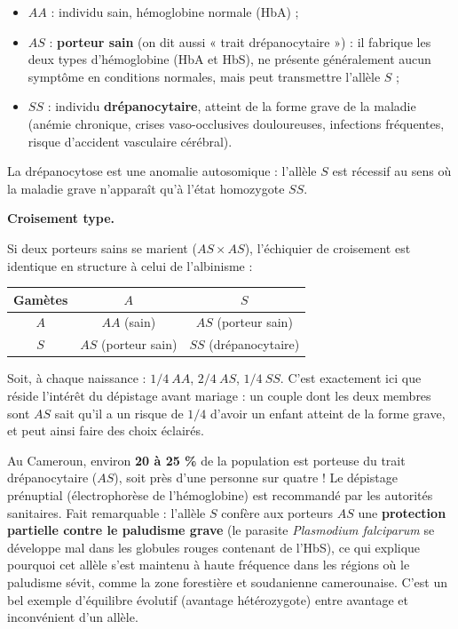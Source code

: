 \documentclass[11pt]{article}
\newcommand{\cle}[1]{{\popxbold\color{popdark}#1}}
\begin{document}
\begin{definition}
\begin{itemize}
\item $AA$ : individu sain, hémoglobine normale (HbA) ;
\item $AS$ : \textbf{porteur sain} (on dit aussi « trait drépanocytaire ») : il fabrique les deux types d'hémoglobine (HbA et HbS), ne présente généralement aucun symptôme en conditions normales, mais peut transmettre l'allèle $S$ ;
\item $SS$ : individu \textbf{drépanocytaire}, atteint de la forme grave de la maladie (anémie chronique, crises vaso-occlusives douloureuses, infections fréquentes, risque d'accident vasculaire cérébral).
\end{itemize}
La drépanocytose est une anomalie autosomique : l'allèle $S$ est récessif au sens où la maladie grave n'apparaît qu'à l'état homozygote $SS$.
\end{definition}

\textbf{Croisement type.}\par
Si deux porteurs sains se marient ($AS \times AS$), l'échiquier de croisement est identique en structure à celui de l'albinisme :

\begin{center}
\begin{tabular}{|c|c|c|}
\hline
\rowcolor{popblueL} \textbf{Gamètes} & $A$ & $S$ \\
\hline
$A$ & $AA$ (sain) & $AS$ (porteur sain) \\
\hline
$S$ & $AS$ (porteur sain) & $SS$ (drépanocytaire) \\
\hline
\end{tabular}
\end{center}

Soit, à chaque naissance : $1/4\ AA$, $2/4\ AS$, $1/4\ SS$. C'est exactement ici que réside l'intérêt du \cle{dépistage avant mariage} : un couple dont les deux membres sont $AS$ sait qu'il a un risque de $1/4$ d'avoir un enfant atteint de la forme grave, et peut ainsi faire des choix éclairés.

\begin{savaistu}
Au Cameroun, environ \textbf{20 à 25 \%} de la population est porteuse du trait drépanocytaire ($AS$), soit près d'une personne sur quatre ! Le dépistage prénuptial (électrophorèse de l'hémoglobine) est recommandé par les autorités sanitaires. Fait remarquable : l'allèle $S$ confère aux porteurs $AS$ une \textbf{protection partielle contre le paludisme grave} (le parasite \emph{Plasmodium falciparum} se développe mal dans les globules rouges contenant de l'HbS), ce qui explique pourquoi cet allèle s'est maintenu à haute fréquence dans les régions où le paludisme sévit, comme la zone forestière et soudanienne camerounaise. C'est un bel exemple d'équilibre évolutif (avantage hétérozygote) entre avantage et inconvénient d'un allèle.
\end{savaistu}
\end{document}

